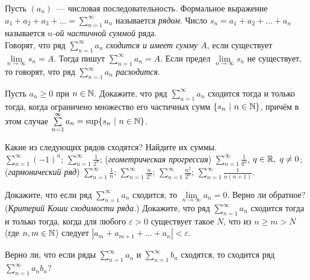 \documentclass[a4paper,12pt]{article}
\begin{document}

\noindent

Пусть $(a_n)$~--- числовая последовательность.
Формальное выражение
$a_1+a_2+a_3+\ldots=\sum\limits_{n=1}^\infty a_n$
называется {\em рядом}.
Число $s_n=a_1+a_2+\dots+a_n$ называется {\em  $n$-ой частичной
суммой} ряда.\\
Говорят, что ряд $\sum\limits_{n=1}^\infty a_n$
{\em сходится и имеет сумму $A$}, если
существует $\lim\limits_{n\to\infty}s_n=A$.
Тогда пишут $\sum\limits_{n=1}^\infty a_n=A$.
Если предел  $\lim\limits_{n\to\infty}s_n$
не существует, то говорят, что ряд $\sum\limits_{n=1}^\infty a_n$
{\em расходится}.

Пусть %
$a_n\geq0$ при $n\in\mathbb{N}$.
Докажите, что ряд $\sum\limits_{n=1}^\infty a_n$ сходится
тогда и только тогда, когда
ограничено множество его частичных
сумм $\{s_n\ |\ n\in\mathbb{N}\}$, причём в этом случае
$\sum\limits_{n=1}^\infty a_n=\sup\{s_n\ |\ n\in\mathbb{N}\}$.

Какие из следующих рядов сходятся? Найдите их суммы.\\
$\sum\limits_{n=1}^\infty (-1)^n$;
$\sum\limits_{n=1}^\infty \frac1{2^n}$;
({\em геометрическая прогрессия})
$\sum\limits_{n=1}^\infty \frac1{q^n}$, $q\in\mathbb{R},\ q\ne0$;\\
({\em гармонический ряд})
$\sum\limits_{n=1}^\infty \frac1n$;
$\sum\limits_{n=1}^\infty \frac{n}{2^n}$;
$\sum\limits_{n=1}^\infty \frac{n^2}{2^n}$;
$\sum\limits_{n=1}^\infty \frac1{n(n+1)}$.

Докажите, что если ряд $\sum\limits_{n=1}^\infty a_n$ сходится,
то $\lim\limits_{n\to\infty}a_n=0$. Верно ли обратное?
({\em Критерий Коши сходимости ряда.})
Докажите, что ряд $\sum\limits_{n=1}^\infty a_n$ сходится тогда и только
тогда, когда для любого $\varepsilon>0$ существует такое $N$, что
из $n\geqslant m>N$
(где $n,m\in\mathbb{N}$) следует $|a_m+a_{m+1}+\dots+a_n|<\varepsilon$.




Верно ли, что если ряды
$\sum\limits_{n=1}^\infty a_n$ и $\sum\limits_{n=1}^\infty b_n$
сходятся, то сходится ряд $\sum\limits_{n=1}^\infty a_nb_n$?
\end{document}

